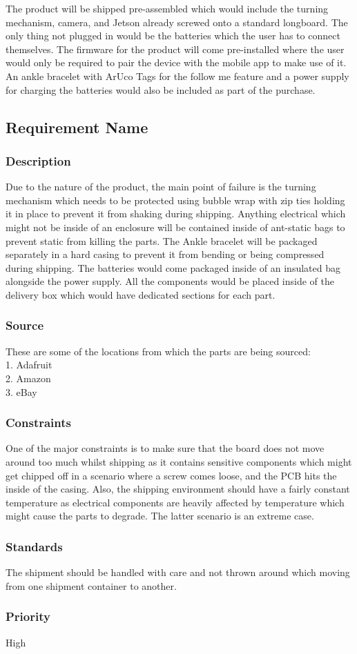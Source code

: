 The product will be shipped pre-assembled which would include the turning mechanism, camera, and Jetson already screwed onto a standard longboard. The only thing not plugged in would be the batteries which the user has to connect themselves. The firmware for the product will come pre-installed where the user would only be required to pair the device with the mobile app to make use of it. An ankle bracelet with ArUco Tags for the follow me feature and a power supply for charging the batteries would also be included as part of the purchase.

\subsection{Requirement Name}
\subsubsection{Description}
Due to the nature of the product, the main point of failure is the turning mechanism which needs to be protected using bubble wrap with zip ties holding it in place to prevent it from shaking during shipping. Anything electrical which might not be inside of an enclosure will be contained inside of ant-static bags to prevent static from killing the parts. The Ankle bracelet will be packaged separately in a hard casing to prevent it from bending or being compressed during shipping. The batteries would come packaged inside of an insulated bag alongside the power supply. All the components would be placed inside of the delivery box which would have dedicated sections for each part.
\subsubsection{Source}
These are some of the locations from which the parts are being sourced:\\
1. Adafruit\\
2. Amazon\\
3. eBay
\subsubsection{Constraints}
One of the major constraints is to make sure that the board does not move around too much whilst shipping as it contains sensitive components which might get chipped off in a scenario where a screw comes loose, and the PCB hits the inside of the casing. Also, the shipping environment should have a fairly constant temperature as electrical components are heavily affected by temperature which might cause the parts to degrade. The latter scenario is an extreme case.
\subsubsection{Standards}
The shipment should be handled with care and not thrown around which moving from one shipment container to another.
\subsubsection{Priority}
High